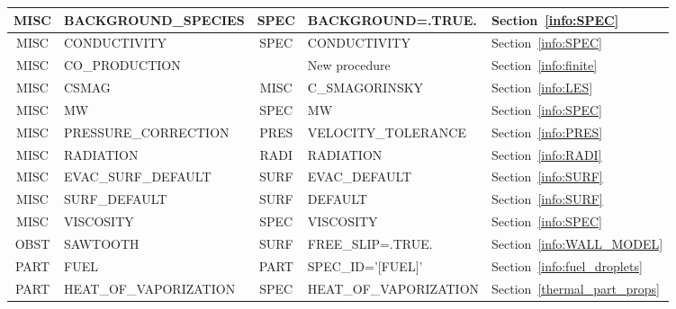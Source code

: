 \documentclass[11pt]{book}
\begin{document}
\begin{table}
\begin{tabular}{@{\extracolsep{\fill}}|c|l|c|l|l|}
{\ct MISC}    & {\ct BACKGROUND\_SPECIES}           &  {\ct SPEC}  & {\ct BACKGROUND=.TRUE.}                     & Section~\ref{info:SPEC}                  \\ \hline
{\ct MISC}    & {\ct CONDUCTIVITY}                  &  {\ct SPEC}  & {\ct CONDUCTIVITY}                          & Section~\ref{info:SPEC}                  \\ \hline
{\ct MISC}    & {\ct CO\_PRODUCTION}                &              & New procedure                               & Section~\ref{info:finite}                \\ \hline
{\ct MISC}    & {\ct CSMAG}                         &  {\ct MISC}  & {\ct C\_SMAGORINSKY}                        & Section~\ref{info:LES}                   \\ \hline
{\ct MISC}    & {\ct MW}                            &  {\ct SPEC}  & {\ct MW}                                    & Section~\ref{info:SPEC}                  \\ \hline
{\ct MISC}    & {\ct PRESSURE\_CORRECTION}          &  {\ct PRES}  & {\ct VELOCITY\_TOLERANCE}                   & Section~\ref{info:PRES}                  \\ \hline
{\ct MISC}    & {\ct RADIATION}                     &  {\ct RADI}  & {\ct RADIATION}                             & Section~\ref{info:RADI}                  \\ \hline
{\ct MISC}    & {\ct EVAC\_SURF\_DEFAULT}           &  {\ct SURF}  & {\ct EVAC\_DEFAULT}                         & Section~\ref{info:SURF}                  \\ \hline
{\ct MISC}    & {\ct SURF\_DEFAULT}                 &  {\ct SURF}  & {\ct DEFAULT}                               & Section~\ref{info:SURF}                  \\ \hline
{\ct MISC}    & {\ct VISCOSITY}                     &  {\ct SPEC}  &  {\ct VISCOSITY}                            & Section~\ref{info:SPEC}                  \\ \hline
{\ct OBST}    & {\ct SAWTOOTH}                      &  {\ct SURF}  & {\ct FREE\_SLIP=.TRUE.}                     & Section~\ref{info:WALL_MODEL}            \\ \hline
{\ct PART}    & {\ct FUEL}                          &  {\ct PART}  & {\ct SPEC\_ID='[FUEL]'}                     & Section~\ref{info:fuel_droplets}         \\ \hline
{\ct PART}    & {\ct HEAT\_OF\_VAPORIZATION}        &  {\ct SPEC}  &  {\ct HEAT\_OF\_VAPORIZATION}               & Section~\ref{thermal_part_props}         \\ \hline

\end{tabular}
\end{table}
\end{document}
